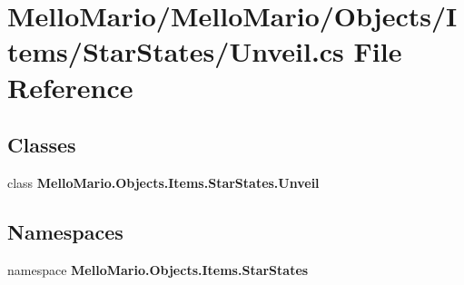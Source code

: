 \section{Mello\+Mario/\+Mello\+Mario/\+Objects/\+Items/\+Star\+States/\+Unveil.cs File Reference}
\label{StarStates_2Unveil_8cs}
\subsection*{Classes}
\begin{DoxyCompactItemize}
\item 
class \textbf{ Mello\+Mario.\+Objects.\+Items.\+Star\+States.\+Unveil}
\end{DoxyCompactItemize}
\subsection*{Namespaces}
\begin{DoxyCompactItemize}
\item 
namespace \textbf{ Mello\+Mario.\+Objects.\+Items.\+Star\+States}
\end{DoxyCompactItemize}
